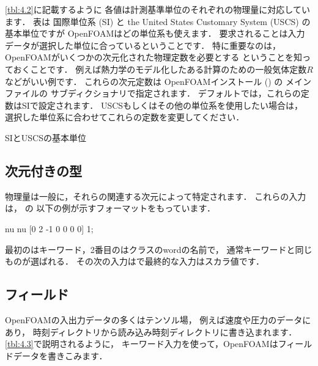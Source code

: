 \autoref{tbl:4.2}に記載するように
各値は計測基準単位のそれぞれの物理量に対応しています．
表は
%
%
国際単位系 (SI) と
%
%
%
the United States Customary System (USCS) の
%
基本単位ですが
OpenFOAMはどの単位系も使えます．
要求されることは入力データが選択した単位に合っているということです．
特に重要なのは，OpenFOAMがいくつかの次元化された物理定数を必要とする
ということを知っておくことです．
例えば熱力学のモデル化したある計算のための一般気体定数$R$などがいい例です．
これらの次元定数は
OpenFOAMインストール () の
メインファイルの
サブディクショナリで指定されます．
デフォルトでは，これらの定数はSIで設定されます．
USCSもしくはその他の単位系を使用したい場合は，
選択した単位系に合わせてこれらの定数を変更してください．


\begin{table}[t]
 
 \caption{SIとUSCSの基本単位}
 \label{tbl:4.2}
\end{table}
%


\subsection{次元付きの型}
\label{ssec:4.2.7}
物理量は一般に，それらの関連する次元によって特定されます．
これらの入力は，\break
{}の
以下の例が示すフォーマットをもっています．
\begin{OFverbatim}[file]
nu             nu  [0 2 -1 0 0 0 0]  1;
\end{OFverbatim}
最初のはキーワード，2番目のはクラスのwordの名前で，
通常キーワードと同じものが選ばれる．
その次の入力はで最終的な入力はスカラ値です．


\subsection{フィールド}
\label{ssec:4.2.8}
OpenFOAMの入出力データの多くはテンソル場，
例えば速度や圧力のデータにあり，
時刻ディレクトリから読み込み時刻ディレクトリに書き込まれます．
\autoref{tbl:4.3}で説明されるように，
キーワード入力を使って，OpenFOAMはフィールドデータを書きこみます．


